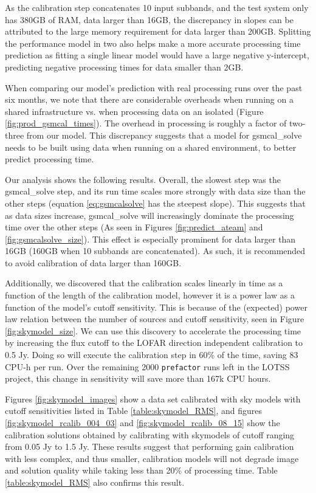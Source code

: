\documentclass[preprint,5p]{elsarticle}
\begin{document}
As the calibration step concatenates 10 input subbands, and the test system only has 380GB of RAM, data larger than 16GB, the discrepancy in slopes can be attributed to the large memory requirement for data larger than 200GB. Splitting the performance model in two also helps make a more accurate processing time prediction as fitting a single linear model would have a large negative y-intercept, predicting negative processing times for data smaller than 2GB. 

When comparing our model's prediction with real processing runs over the past six months, we note that there are considerable overheads when running on a shared infrastructure vs.  when processing data on an isolated (Figure \ref{fig:prod_gsmcal_times}). The overhead in processing is roughly a factor of two-three from our model. This discrepancy suggests that a model for {\selectfont gsmcal\_solve} needs to be built using data when running on a shared environment, to better predict processing time. 

Our analysis shows the following results. Overall, the slowest step was the {\selectfont gsmcal\_solve} step, and its run time scales more strongly with data size than the other steps (equation \ref{eq:gsmcalsolve} has the steepest slope). This suggests that as data sizes increase, {\selectfont gsmcal\_solve} will increasingly dominate the processing time over the other steps (As seen in Figures \ref{fig:predict_ateam} and \ref{fig:gsmcalsolve_size}). This effect is especially prominent for data larger than 16GB (160GB when 10 subbands are concatenated). As such, it is recommended to avoid calibration of data larger than 160GB. 

Additionally, we discovered that the calibration scales linearly in time as a function of the length of the calibration model, however it is a power law as a function of the model's cutoff sensitivity. This is because of the (expected) power law relation between the number of sources and cutoff sensitivity, seen in Figure \ref{fig:skymodel_size}. We can use this discovery to accelerate the processing time by increasing the flux cutoff to the LOFAR direction independent calibration to 0.5 Jy. Doing so will execute the calibration step in 60\% of the time, saving 83 CPU-h per run. Over the remaining 2000 \texttt{prefactor} runs left in the LOTSS project, this change in sensitivity will save more than 167k CPU hours. 

Figures \ref{fig:skymodel_images} show a data set calibrated with sky models with cutoff sensitivities listed in Table \ref{table:skymodel_RMS}, and figures  \ref{fig:skymodel_rcalib_004_03} and \ref{fig:skymodel_rcalib_08_15} show the calibration solutions obtained by calibrating with skymodels of cutoff ranging from 0.05 Jy to 1.5 Jy. These results suggest that performing gain calibration with less complex, and thus smaller, calibration models will not degrade image and solution quality while taking less than 20\% of processing time. Table \ref{table:skymodel_RMS} also confirms this result. 
\end{document}
